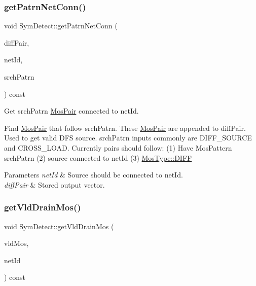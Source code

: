 \subsubsection{\texorpdfstring{get\+Patrn\+Net\+Conn()}{getPatrnNetConn()}}
{\footnotesize\ttfamily void Sym\+Detect\+::get\+Patrn\+Net\+Conn (\begin{DoxyParamCaption}\item[{std\+::vector$<$ \hyperlink{classMosPair}{Mos\+Pair} $>$ \&}]{diff\+Pair,  }\item[{\hyperlink{type_8h_a581e8093e28e7362f2b6937296190676}{Index\+Type}}]{net\+Id,  }\item[{\hyperlink{type_8h_af19eddb079bfea723256710b029c38e8}{Mos\+Pattern}}]{srch\+Patrn }\end{DoxyParamCaption}) const\hspace{0.3cm}{\ttfamily [private]}}



Get srch\+Patrn \hyperlink{classMosPair}{Mos\+Pair} connected to net\+Id. 

Find \hyperlink{classMosPair}{Mos\+Pair} that follow srch\+Patrn. These \hyperlink{classMosPair}{Mos\+Pair} are appended to diff\+Pair. Used to get valid D\+FS source. srch\+Patrn inputs commonly are D\+I\+F\+F\+\_\+\+S\+O\+U\+R\+CE and C\+R\+O\+S\+S\+\_\+\+L\+O\+AD. Currently pairs should follow\+: (1) Have Mos\+Pattern srch\+Patrn (2) source connected to net\+Id (3) \hyperlink{type_8h_a34a6a66323cfecf83dfe00bc8fd96333aa2e1ec2dd3d8195d238c5494f0ac5578}{Mos\+Type\+::\+D\+I\+FF}


\begin{DoxyParams}{Parameters}
{\em net\+Id} & Source should be connected to net\+Id. \\
\hline
{\em diff\+Pair} & Stored output vector. \\
\hline
\end{DoxyParams}
\mbox{\label{classSymDetect_a48c23173bf5e56c3aa11ac306715cba2}} 
\subsubsection{\texorpdfstring{get\+Vld\+Drain\+Mos()}{getVldDrainMos()}}
{\footnotesize\ttfamily void Sym\+Detect\+::get\+Vld\+Drain\+Mos (\begin{DoxyParamCaption}\item[{std\+::vector$<$ \hyperlink{type_8h_a581e8093e28e7362f2b6937296190676}{Index\+Type} $>$ \&}]{vld\+Mos,  }\item[{\hyperlink{type_8h_a581e8093e28e7362f2b6937296190676}{Index\+Type}}]{net\+Id }\end{DoxyParamCaption}) const\hspace{0.3cm}{\ttfamily [private]}}



